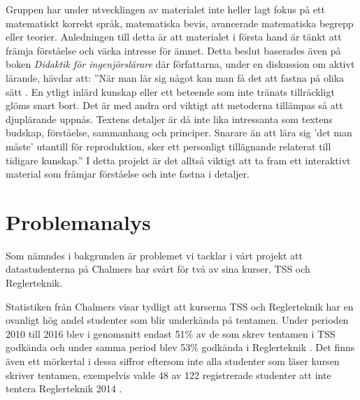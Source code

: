 \documentclass[12pt,a4paper,twoside,openright]{article}
\begin{document}
Gruppen har under utvecklingen av materialet inte heller lagt fokus på
ett matematiskt korrekt språk, matematiska bevis, avancerade matematiska
begrepp eller teorier. Anledningen till detta är att materialet i
första hand är tänkt att främja förståelse och väcka intresse för
ämnet. Detta beslut baserades även på boken \textit{Didaktik för
 ingenjörslärare} där författarna, under en diskussion om aktivt
lärande, hävdar att: ”När man lär sig något kan man få det att fastna
på olika sätt \cite{didaktik_for_ingenjorslarare}. En ytligt inlärd kunskap eller ett beteende som inte
tränats tillräckligt glöms snart bort. Det är med andra ord viktigt
att metoderna tillämpas så att djuplärande uppnås. Textens detaljer är
då inte lika intressanta som textens budskap, förståelse, sammanhang
och principer. Snarare än att lära sig 'det man måste' utantill för
reproduktion, sker ett personligt tillägnande relaterat till tidigare
kunskap.” I detta projekt är det alltså viktigt att ta fram ett
interaktivt material som främjar förståelse och inte fastna i
detaljer.

\section{Problemanalys}


Som nämndes i bakgrunden är problemet vi tacklar i vårt projekt att
datastudenterna på Chalmers har svårt för två av sina kurser, TSS och
Reglerteknik.

Statistiken från Chalmers visar tydligt att kurserna TSS och
Reglerteknik har en ovanligt hög andel studenter som blir
underkända på tentamen. Under perioden 2010 till 2016 blev i genomsnitt
endast 51\% av de som skrev tentamen i TSS godkända och under samma
period blev 53\% godkända i Reglerteknik \cite{tentastatistik}.
Det finns även ett mörkertal i dessa siffror eftersom inte alla studenter som läser kursen
skriver tentamen, exempelvis valde 48 av 122 registrerade
studenter att inte tentera Reglerteknik 2014
\cite{kursinformation:ere102:14-15}.
\end{document}
